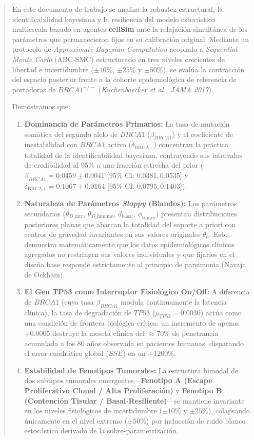 \documentclass[10pt,a4paper]{article}
\begin{document}
\begin{abstract}
\noindent
En este documento de trabajo se analiza la robustez estructural, la identificabilidad bayesiana y la resiliencia del modelo estocástico multiescala basado en agentes \textbf{cellSim} ante la relajación simultánea de los parámetros que permanecieron fijos en su calibración original. Mediante un protocolo de \textit{Approximate Bayesian Computation} acoplado a \textit{Sequential Monte Carlo} (ABC-SMC) estructurado en tres niveles crecientes de libertad e incertidumbre ($\pm10\%$, $\pm25\%$ y $\pm50\%$), se evalúa la contracción del espacio posterior frente a la cohorte epidemiológica de referencia de portadoras de $BRCA1^{+/-}$ (\textit{Kuchenbaecker et al., JAMA 2017}).

\vspace{0.5em}
\noindent Demostramos que:
\begin{enumerate}
    \item \textbf{Dominancia de Parámetros Primarios:} La tasa de mutación somática del segundo alelo de $BRCA1$ ($\beta_{BRCA1}$) y el coeficiente de inestabilidad con $BRCA1$ activo ($\delta_{\text{BRCA+}}$) concentran la práctica totalidad de la identificabilidad bayesiana, contrayendo sus intervalos de credibilidad al 95\% a una fracción estrecha del prior ($\beta_{BRCA1} = 0.0459 \pm 0.0041$ [$95\%\text{ CI: } 0.0381, 0.0535$] y $\delta_{\text{BRCA+}} = 0.1067 \pm 0.0164$ [$95\%\text{ CI: } 0.0795, 0.1403$]).
    \item \textbf{Naturaleza de Parámetros \textit{Sloppy} (Blandos):} Los parámetros secundarios ($\theta_{D\text{\_intr}}$, $\theta_{D\text{\_inmune}}$, $d_{\text{basal}}$, $\phi_{\text{tumor}}$) presentan distribuciones posteriores planas que abarcan la totalidad del soporte a priori con centros de gravedad invariantes en sus valores originales $\theta_0$. Esto demuestra matemáticamente que los datos epidemiológicos clínicos agregados no restringen sus valores individuales y que fijarlos en el diseño base responde estrictamente al principio de parsimonia (Navaja de Ockham).
    \item \textbf{El Gen TP53 como Interruptor Fisiológico On/Off:} A diferencia de $BRCA1$ (cuya tasa $\beta_{BRCA1}$ modula continuamente la latencia clínica), la tasa de degradación de $TP53$ ($\mu_{TP53} = 0.0030$) actúa como una condición de frontera biológica crítica: un incremento de apenas $+0.0005$ destruye la meseta clínica del $\approx 70\%$ de penetrancia acumulada a los 80 años observada en pacientes humanas, disparando el error cuadrático global ($SSE$) en un $+1200\%$.
    \item \textbf{Estabilidad de Fenotipos Tumorales:} La estructura bimodal de dos subtipos tumorales emergentes---\textbf{Fenotipo A (Escape Proliferativo Clonal / Alta Proliferación)} y \textbf{Fenotipo B (Contención Tisular / Basal-Resiliente)}---se mantiene invariante en los niveles fisiológicos de incertidumbre ($\pm10\%$ y $\pm25\%$), colapsando únicamente en el nivel extremo ($\pm50\%$) por inducción de ruido blanco estocástico derivado de la sobre-parametrización.
\end{enumerate}
\end{abstract}
\end{document}
